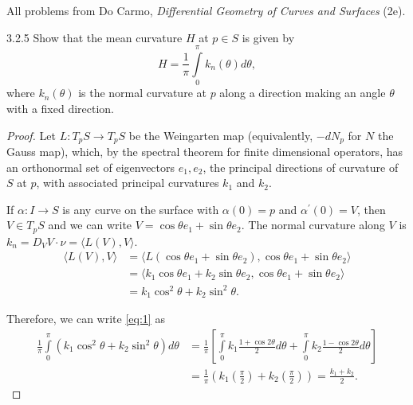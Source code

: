 \documentclass[11pt]{article}
\begin{document}
All problems from Do Carmo, \textit{Differential Geometry of Curves and Surfaces} (2e).

\begin{problem}{3.2.5}
  Show that the mean curvature \( H \) at \( p \in S \) is given by
  \begin{equation}
  \label{eq:1}
  H = \frac{1}{\pi} \int\limits_0^{\pi} k_n(\theta) d \theta,
\end{equation}
where \( k_n(\theta) \) is the normal curvature at \( p \) along a direction making an angle \(\theta\) with a fixed direction.
\end{problem}
\begin{proof}
  Let \( L: T_pS \rightarrow T_pS \) be the Weingarten map (equivalently, \( -dN_p \) for \( N \) the Gauss map), which, by the spectral theorem for finite dimensional operators, has an orthonormal set of eigenvectors \( e_1, e_2 \), the principal directions of curvature of \( S \) at \( p \), with associated principal curvatures \( k_1 \) and \( k_2 \).

  If \(\alpha: I \rightarrow S\) is any curve on the surface with \(\alpha(0)=p\) and \( \alpha^{\prime}(0) = V \), then \( V \in T_pS \) and we can write \( V = \cos\theta e_1 + \sin\theta e_2 \).
  The normal curvature along \( V \) is \( k_n = D_VV \cdot \nu = \langle L(V), V \rangle \).
  \begin{equation}
  \label{eq:9}
  \begin{aligned}
    \langle L(V), V \rangle &= \langle L(\cos\theta e_1 + \sin\theta e_2), \cos\theta e_1 + \sin\theta e_2 \rangle \\
                &= \langle k_1\cos\theta e_1 + k_2\sin\theta e_2, \cos\theta e_1 + \sin\theta e_2 \rangle \\
    &= k_1\cos^2\theta + k_2 \sin^2\theta.
  \end{aligned}
\end{equation}

Therefore, we can write \cref{eq:1} as
\begin{equation}
\label{eq:10}
\begin{aligned}
  \frac{1}{\pi} \int\limits_0^{\pi} (k_1\cos^2\theta + k_2\sin^2\theta) d\theta &= \frac{1}{\pi} \left[ \int\limits_0^{\pi} k_1 \frac{1 + \cos2\theta}{2}d\theta + \int\limits_0^{\pi} k_2 \frac{1-\cos2\theta}{2}d\theta \right] \\
  &= \frac{1}{\pi} \left( k_1( \frac{\pi}{2} ) + k_2( \frac{\pi}{2} ) \right) = \frac{k_{1} + k_2}{2}.
\end{aligned}
\end{equation}
\end{proof}
\end{document}
